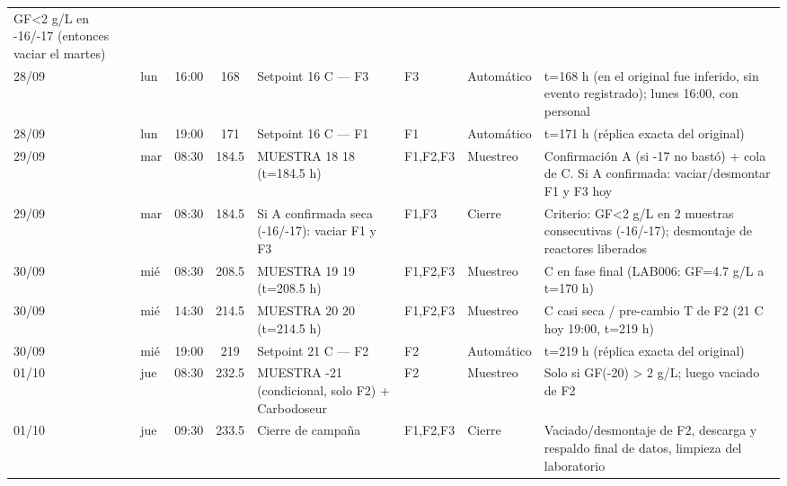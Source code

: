 \documentclass[10pt,landscape]{article}
\begin{document}
{\begin{longtable}{L{1.7cm} L{1.2cm} L{1.1cm} c L{4.6cm} L{1.6cm} L{1.7cm} L{7.2cm}}
GF<2 g/L en -16/-17 (entonces vaciar el martes) \\28/09 & lun & 16:00 & 168 & Setpoint 16 \textdegree{}C — F3 & F3 & Automático & t=168 h (en el original fue inferido, sin evento registrado); lunes 16:00, con personal \\28/09 & lun & 19:00 & 171 & Setpoint 16 \textdegree{}C — F1 & F1 & Automático & t=171 h (réplica exacta del original) \\29/09 & mar & 08:30 & 184.5 & MUESTRA 18 18 (t=184.5 h) & F1,F2,F3 & Muestreo & Confirmación A (si -17 no bastó) + cola de C. Si A confirmada: vaciar/desmontar F1 y F3 hoy \\29/09 & mar & 08:30 & 184.5 & Si A confirmada seca (-16/-17): vaciar F1 y F3 & F1,F3 & Cierre & Criterio: GF<2 g/L en 2 muestras consecutivas (-16/-17); desmontaje de reactores liberados \\30/09 & mié & 08:30 & 208.5 & MUESTRA 19 19 (t=208.5 h) & F1,F2,F3 & Muestreo & C en fase final (LAB006: GF=4.7 g/L a t=170 h) \\30/09 & mié & 14:30 & 214.5 & MUESTRA 20 20 (t=214.5 h) & F1,F2,F3 & Muestreo & C casi seca / pre-cambio T de F2 (21 \textdegree{}C hoy 19:00, t=219 h) \\30/09 & mié & 19:00 & 219 & Setpoint 21 \textdegree{}C — F2 & F2 & Automático & t=219 h (réplica exacta del original) \\01/10 & jue & 08:30 & 232.5 & MUESTRA -21 (condicional, solo F2) + Carbodoseur & F2 & Muestreo & Solo si GF(-20) > 2 g/L; luego vaciado de F2 \\01/10 & jue & 09:30 & 233.5 & Cierre de campaña & F1,F2,F3 & Cierre & Vaciado/desmontaje de F2, descarga y respaldo final de datos, limpieza del laboratorio \\
\bottomrule
\end{longtable}
}
\end{document}
